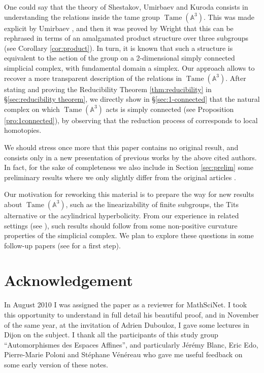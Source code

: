 \documentclass[reqno,oneside,11pt]{amsart}
\theoremstyle{plain}
\theoremstyle{definition}
\newcommand{\A}{{\mathbb{A}}}
\DeclareMathOperator{\Tame}{Tame}
\newcommand{\TA}{\Tame(\A^3)}
\DeclareRobustCommand{\SkipTocEntry}[5]{}
\begin{document}
One could say that the theory of Shestakov, Umirbaev and Kuroda consists in understanding the relations inside the tame group $\TA$.
This was made explicit by Umirbaev \cite{U}, and then it was proved by Wright
\cite{wright} that this can be rephrased in terms of an amalgamated product
structure over three subgroups (see Corollary \ref{cor:product}).
In turn, it is known that such a structure is equivalent to the action of the group on a 2-dimensional simply connected simplicial complex, with fundamental domain a simplex.
Our approach allows to recover a more transparent description of the relations in $\TA$.
After stating and proving the Reducibility Theorem \ref{thm:reducibility} in \S\ref{sec:reducibility theorem}, we directly show in \S\ref{sec:1-connected} that the natural complex on which $\TA$ acts is simply connected (see Proposition \ref{pro:1connected}), by observing that the reduction process of  \cite{Ku:main, SU:main} corresponds to local homotopies.

We should stress once more that this paper contains no original result, and consists only in a new presentation of previous works by the above cited authors.
In fact, for the sake of completeness we also include in Section \ref{sec:prelim} some preliminary results where we only slightly differ from the original articles \cite{Ku:ineq, SU:ineq}.

Our motivation for reworking this material is to prepare the way for new results about $\TA$, such as the linearizability of finite subgroups, the Tits alternative or the acylindrical hyperbolicity.
From our experience in related settings (see \cite{BFL, CL, Lonjou, Martin}), such results should follow from some non-positive curvature properties of the simplicial complex.
We plan to explore these questions in some follow-up papers (see \cite{LP} for a first step).

\section*{Acknowledgement}
In August 2010 I was assigned the paper \cite{Ku:main} as a reviewer for
MathSciNet.
I took this opportunity to understand in full detail his beautiful proof, and
in November of the same year, at the invitation of Adrien Dubouloz, I gave some lectures in Dijon on the subject.
I thank all the participants of this study group ``Automorphismes des Espaces
Affines'', and  particularly Jérémy Blanc, Eric Edo, Pierre-Marie
Poloni and Stéphane Vénéreau who gave me useful feedback on some early version of these notes.
\end{document}
